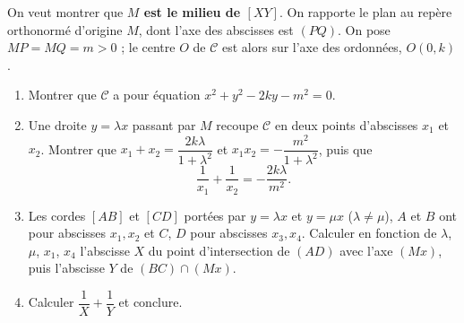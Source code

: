 On veut montrer que \textbf{$M$ est le milieu de $[XY]$}. On rapporte le plan au repère orthonormé d'origine $M$, dont l'axe des abscisses est $(PQ)$. On pose $MP=MQ=m>0$ ; le centre $O$ de $\mathcal C$ est alors sur l'axe des ordonnées, $O(0,k)$.
\begin{enumerate}
  \item Montrer que $\mathcal C$ a pour équation $x^2+y^2-2ky-m^2=0$.
  \item Une droite $y=\lambda x$ passant par $M$ recoupe $\mathcal C$ en deux points d'abscisses $x_1$ et $x_2$. Montrer que $x_1+x_2=\dfrac{2k\lambda}{1+\lambda^2}$ et $x_1x_2=-\dfrac{m^2}{1+\lambda^2}$, puis que
  \[\dfrac1{x_1}+\dfrac1{x_2}=-\dfrac{2k\lambda}{m^2}.\]
  \item Les cordes $[AB]$ et $[CD]$ portées par $y=\lambda x$ et $y=\mu x$ ($\lambda\neq\mu$), $A$ et $B$ ont pour abscisses $x_1,x_2$ et $C$, $D$ pour abscisses $x_3,x_4$. Calculer en fonction de $\lambda$, $\mu$, $x_1$, $x_4$ l'abscisse $X$ du point d'intersection de $(AD)$ avec l'axe $(Mx)$, puis l'abscisse $Y$ de $(BC)\cap(Mx)$.
  \item Calculer $\dfrac1X+\dfrac1Y$ et conclure.
\end{enumerate}

